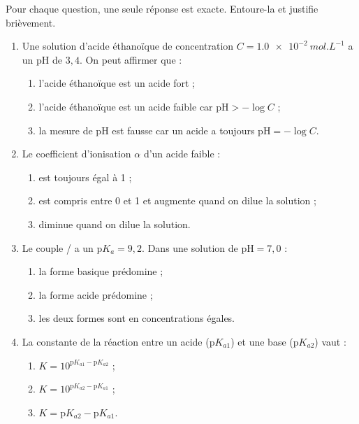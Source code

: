 \documentclass[11pt]{article}
\begin{document}
\begin{exercice}
Pour chaque question, une seule réponse est exacte. Entoure-la et justifie brièvement.
\begin{enumerate}
\item Une solution d'acide éthanoïque de concentration $C = \SI{1,0e-2}{mol.L^{-1}}$ a un pH de $3,4$. On peut affirmer que :
\begin{enumerate}
\item l'acide éthanoïque est un acide fort ;
\item l'acide éthanoïque est un acide faible car $\mathrm{pH} > -\log C$ ;
\item la mesure de pH est fausse car un acide a toujours $\mathrm{pH} = -\log C$.
\end{enumerate}
\item Le coefficient d'ionisation $\alpha$ d'un acide faible :
\begin{enumerate}
\item est toujours égal à 1 ;
\item est compris entre 0 et 1 et augmente quand on dilue la solution ;
\item diminue quand on dilue la solution.
\end{enumerate}
\item Le couple / a un $\mathrm{p}K_a = 9,2$. Dans une solution de $\mathrm{pH} = 7,0$ :
\begin{enumerate}
\item la forme basique  prédomine ;
\item la forme acide  prédomine ;
\item les deux formes sont en concentrations égales.
\end{enumerate}
\item La constante de la réaction entre un acide  ($\mathrm{p}K_{a1}$) et une base  ($\mathrm{p}K_{a2}$) vaut :
\begin{enumerate}
\item $K = 10^{\mathrm{p}K_{a1} - \mathrm{p}K_{a2}}$ ;
\item $K = 10^{\mathrm{p}K_{a2} - \mathrm{p}K_{a1}}$ ;
\item $K = \mathrm{p}K_{a2} - \mathrm{p}K_{a1}$.
\end{enumerate}
\end{enumerate}
\end{exercice}
\end{document}
